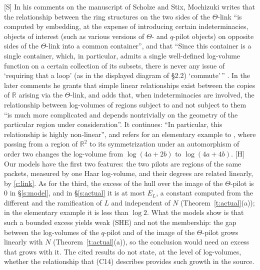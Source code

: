 \documentclass[11pt]{article}
\theoremstyle{plain}
\theoremstyle{definition}
\theoremstyle{remark}
\newcommand{\Smark}{\textup{[S]}}
\newcommand{\Hmark}{\textup{[H]}}
\begin{document}
\Smark{} In his comments on the manuscript of Scholze and Stix, Mochizuki writes that the
relationship between the ring structures on the two sides of the $\Theta$-link ``is
computed by embedding, at the expense of introducing certain indeterminacies, objects of
interest (such as various versions of $\Theta$- and $q$-pilot objects) on opposite sides of
the $\Theta$-link into a common container'', and that ``Since this container is a single
container, which, in particular, admits a single well-defined log-volume function on a
certain collection of its subsets, there is never any issue of `requiring that a loop' (as
in the displayed diagram of \S2.2) `commute'\,'' \cite[(C17)]{Cmt18a}. In the later
comments \cite[(C14)]{Cmt18b} he grants that simple linear relationships exist between the
copies of $\mathbb R$ arising via the $\Theta$-link, and adds that, when indeterminacies
are involved, the relationship between log-volumes of regions subject to and not subject to
them ``is much more complicated and depends nontrivially on the geometry of the particular
region under consideration''. It continues: ``In particular, this relationship is
highly non-linear'', and refers for an elementary example to \cite[(LVEx)]{Rpt}, where
passing from a region of $\mathbb R^2$ to its symmetrization under an automorphism of order
two changes the log-volume from $\log(4a+2b)$ to $\log(4a+4b)$. \Hmark{} Our models have
the first two features: the two pilots are regions of the same packets, measured by one
Haar log-volume, and their degrees are related linearly, by \ref{c:link}. As for the third,
the excess of the hull over the image of the $\Theta$-pilot is $0$ in \S\ref{s:model}, and
in \S\ref{s:actual} it is at most $E_L$, a constant computed from the different and the
ramification of $L$ and independent of $N$ (Theorem~\ref{t:actual}(a)); in the elementary
example it is less than $\log 2$. What the models show is that such a bounded excess yields
weak (SHE) and not the membership: the gap between the log-volumes of the $q$-pilot and of
the image of the $\Theta$-pilot grows linearly with $N$ (Theorem~\ref{t:actual}(a)), so
the conclusion would need an excess that grows with it. The cited results do not state, at
the level of log-volumes, whether the relationship that (C14) describes provides such
growth in the source.
\end{document}
